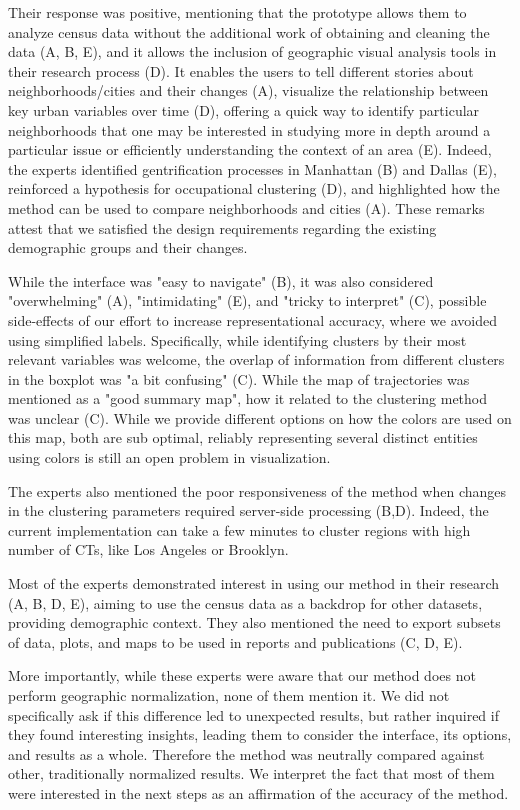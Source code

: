 Their response was positive,  mentioning that the prototype allows them to
analyze census data without the additional work of obtaining and cleaning the
data (A, B, E), and it allows the inclusion of geographic visual analysis tools
in their research process (D). It enables the users to tell different stories
about neighborhoods/cities and their changes (A), visualize the relationship
between key urban variables over time (D), offering a quick way to identify
particular neighborhoods that one may be interested in studying more in depth
around a particular issue or efficiently understanding the context of an area
(E).  Indeed, the experts identified gentrification processes in Manhattan (B)
and Dallas (E), reinforced a hypothesis for occupational clustering (D), and
highlighted how the method can be used to compare neighborhoods and cities (A).
These remarks attest that we satisfied the design requirements regarding the
existing demographic groups and their changes.



While the interface was "easy to navigate" (B), it was also considered
"overwhelming" (A), "intimidating" (E), and "tricky to interpret" (C), possible
side-effects of our effort to increase  representational accuracy, where we
avoided using simplified labels. Specifically, while identifying clusters by
their most relevant variables was welcome, the overlap of information from
different clusters in the boxplot was "a bit confusing" (C). While the map of
trajectories was mentioned as a "good summary map", how it related to the
clustering method was unclear (C). While we provide different options on how the
colors are used on this map, both are sub optimal, reliably representing several
distinct entities using colors is still an open problem in visualization.


The experts also mentioned the poor responsiveness of the method when changes in
the clustering parameters required server-side processing (B,D). Indeed, the
current implementation can take a few minutes to cluster regions with high
number of CTs, like Los Angeles or Brooklyn.

Most of the experts demonstrated interest in using our method in their research
(A, B, D, E), aiming to use the census data as a backdrop for other datasets,
providing demographic context. They also mentioned the need to export subsets of
data, plots, and maps to be used in reports and publications (C, D, E).


More importantly, while these experts were aware that our method does not
perform geographic normalization, none of them mention it. We did not
specifically ask if this difference led to unexpected results, but rather
inquired if they found interesting insights, leading them to consider the
interface, its options, and results as a whole. Therefore the method was
neutrally compared against other, traditionally normalized results. We interpret
the fact that most of them were interested in the next steps as an affirmation
of the accuracy of the method.